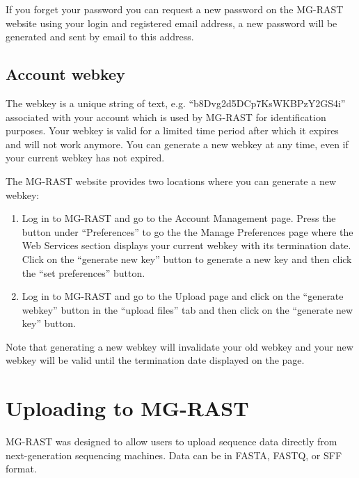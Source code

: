 \documentclass[12pt,fullpage]{report}
\begin{document}
If you forget your password you can request a new password on the MG-RAST website using your login and registered email address, a new password will
be generated and sent by email to this address.
\subsection{Account webkey}
\label{section:webkey}
The webkey is a unique string of text, e.g. ``b8Dvg2d5DCp7KsWKBPzY2GS4i'' associated with your account which is used by MG-RAST for identification
purposes. Your webkey is valid for a limited time period after which it expires and will not work anymore. You can generate a new webkey at any time, even if your current webkey has not expired.

The MG-RAST website provides two locations where you can generate a new webkey:

\begin{enumerate}
\item Log in to MG-RAST and go to the Account Management page. Press the button under ``Preferences'' to go the the Manage Preferences page where the Web Services section displays your current webkey with its termination date. Click on the ``generate new key'' button to generate a new key and then click the ``set preferences'' button.
\item Log in to MG-RAST and go to the Upload page and click on the ``generate webkey'' button in the ``upload files'' tab and then click on the ``generate new key'' button.
\end{enumerate}

\noindent
Note that generating a new webkey will invalidate your old webkey and your new webkey will be valid until the termination date displayed on the page.
\section{Uploading to MG-RAST}

MG-RAST was designed to allow users to upload sequence data directly from next-generation sequencing machines. Data can be in FASTA, FASTQ, or SFF format.
\end{document}
